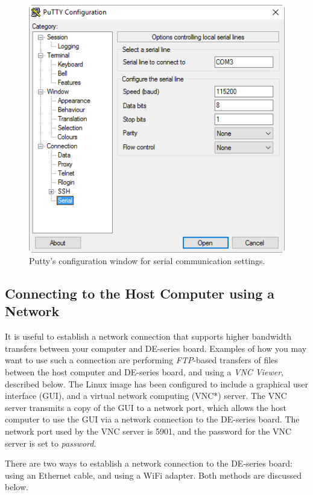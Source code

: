 \documentclass[11pt, twoside, pdftex]{article}
\begin{document}
~\\
\begin{figure}[H]
   \begin{center}
       \includegraphics[scale=0.8]{figures/fig_putty_tut_2}
   \end{center}
   \caption{Putty's configuration window for serial communication settings.}
	\label{fig:putty_2}
\end{figure}

\subsection{Connecting to the Host Computer using a Network}
\label{sec:conn_network}

It is useful to establish a network connection that supports higher bandwidth
transfers between your computer and DE-series board. Examples of how you may want to use 
such a connection are performing {\it FTP}-based transfers of files between the host
computer and DE-series board, and using a 
{\it VNC Viewer}, described below.  The Linux image has been configured to include 
a graphical user interface (GUI), and a virtual network computing (VNC*) server. The 
VNC server transmits a copy of the GUI to a network port, which allows the host computer 
to use the GUI via a network connection to the DE-series board. The network port used 
by the VNC server is 5901, and the password for the VNC server is set to {\it password}.

There are two ways to establish a network connection to the DE-series board: using an
Ethernet cable, and using a WiFi adapter. Both methods are discussed below.
\end{document}
